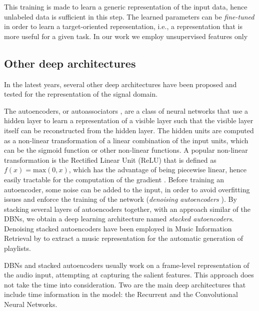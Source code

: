 This training is made to learn a generic representation of the input data, hence unlabeled data is sufficient in this step. The learned parameters can be \textit{fine-tuned} in order to learn a target-oriented representation, i.e., a representation that is more useful for a given task. In our work we employ unsupervised features only

\subsection{Other deep architectures}\label{sec:LLFs:otherdeep}
In the latest years, several other deep architectures have been proposed and tested for the representation of the signal domain.

The autoencoders, or autoassociators \cite{Bengio2009}, are a class of neural networks that use a hidden layer to learn a representation of a visible layer such that the visible layer itself can be reconstructed from the hidden layer. The hidden units are computed as a non-linear transformation of a linear combination of the input units, which can be the sigmoid function or other non-linear functions. A popular non-linear transformation is the Rectified Linear Unit (ReLU) that is defined as $f(x)=\text{max}(0,x)$, which has the advantage of being piecewise linear, hence easily tractable for the computation of the gradient \cite{Zeiler2013}. Before training an autoencoder, some noise can be added to the input, in order to avoid overfitting issues and enforce the training of the network (\textit{denoising autoencoders} \cite{vincent2008extracting}). By stacking several layers of autoencoders together, with an approach similar of the DBNs, we obtain a deep learning architecture named \textit{stacked autoencoders}. Denoising stacked autoencoders have been employed in Music Information Retrieval by \cite{maillet2009steerable} to extract a music representation for the automatic generation of playlists.

DBNs and stacked autoencoders usually work on a frame-level representation of the audio input, attempting at capturing the salient features. This approach does not take the time into consideration. %
Two are the main deep architectures that include time information in the model: the Recurrent and the Convolutional Neural Networks.

